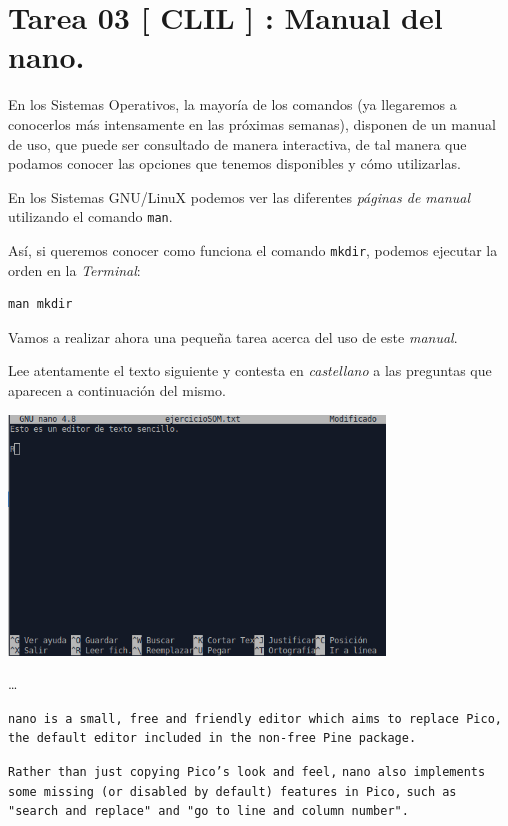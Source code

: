 \documentclass[11pt]{article}
\begin{document}
\section{Tarea 03 [ CLIL ] : Manual del nano.}
\label{sec:orgb1e4a7d}

En los Sistemas Operativos, la mayoría de los comandos (ya llegaremos 
a conocerlos más intensamente en las próximas semanas), disponen de un 
manual de uso, que puede ser consultado de manera interactiva, de tal 
manera que podamos conocer las opciones que tenemos disponibles y cómo utilizarlas.

En los Sistemas GNU/LinuX podemos ver las diferentes \emph{páginas de manual} 
utilizando el comando \texttt{man}. 

Así, si queremos conocer como funciona el comando \texttt{mkdir}, podemos ejecutar 
la orden en la \emph{Terminal}:

\begin{verbatim}
man mkdir
\end{verbatim}

Vamos a realizar ahora una pequeña tarea acerca del uso de este \emph{manual}.

Lee atentamente el texto siguiente y contesta en \emph{castellano} a las 
preguntas que aparecen a continuación del mismo.


\begin{center}
\includegraphics[width=10cm]{./imgs/nano-ejemplo.png}
\end{center}

\ldots{}

\texttt{nano is a small, free and friendly editor which aims to replace Pico,} 
\texttt{the default editor included in the non-free Pine package.} 

\texttt{Rather than just copying Pico's look and feel,}
\texttt{nano also implements some missing (or disabled by default) features in Pico,} 
\texttt{such as "search and replace" and "go to line and column number".}
\end{document}
